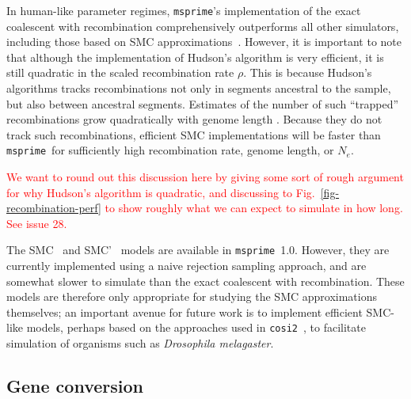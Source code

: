 \documentclass{article}
\newcommand{\msprime}[0]{\texttt{msprime}}
\newcommand{\jkcomment}[1]{\textcolor{red}{#1}}
\begin{document}
In human-like parameter regimes, \msprime's implementation of the
exact coalescent with recombination comprehensively outperforms
all other simulators, including those based on SMC
approximations~\citep{kelleher2016efficient}. However, it is important
to note that although the implementation of Hudson's algorithm is
very efficient, it is still quadratic in the scaled recombination rate
$\rho$. This is because Hudson's algorithms tracks recombinations not only
in segments ancestral to the sample, but also between ancestral segments.
Estimates of the number of such ``trapped'' recombinations grow quadratically
with genome length \citep[Eq.~5.10]{hein2004gene}.
Because they do not track such recombinations, efficient SMC implementations
will be faster than \msprime\ for sufficiently high recombination rate,
genome length, or $N_e$. %


\jkcomment{We want to round out this discussion here by giving some
sort of rough argument for why Hudson's algorithm is quadratic, and discussing
to Fig.~\ref{fig-recombination-perf} to show roughly what we can expect
to simulate in how long. See issue 28.}

The SMC~\citep{mcvean2005approximating} and
SMC'~\citep{marjoram2006fast} models are available
in \msprime\ 1.0. However, they are currently implemented using a
naive rejection sampling approach, and are somewhat slower
to simulate than the exact coalescent with recombination. These
models are therefore only appropriate for studying the SMC approximations
themselves; an important avenue for future work is to implement
efficient SMC-like models, perhaps based on the approaches used
in \texttt{cosi2}~\citep{shlyakhter2014cosi2}, to facilitate
simulation of organisms such as \textit{Drosophila melagaster}.


\subsection*{Gene conversion}
\end{document}
